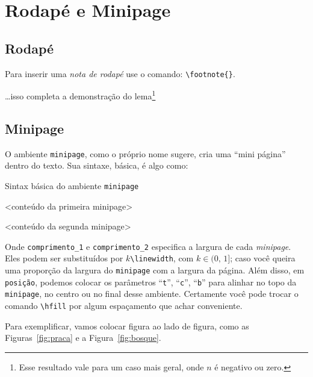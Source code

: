 %
  \section{Rodapé e Minipage} %
  \label{sec:pemini}
%
%
  \subsection{Rodapé}
%
Para inserir uma \textit{nota de rodapé} use o comando: \Verb|\footnote{}|.

\begin{tcblisting}{}
\ldots isso completa a demonstração do lema\footnote{Esse resultado vale para 
um caso mais geral, onde $n$ é negativo ou zero.}
\end{tcblisting}

%
  \subsection{Minipage}
%

O ambiente \texttt{minipage}, como o próprio nome sugere, cria uma ``mini página'' 
dentro do texto.
Sua sintaxe, básica, é algo como:

\begin{codigo}{Sintax básica do ambiente \texttt{minipage}}{\lapis}
\begin{minipage}[posição]{comprimento_1}
  <conteúdo da primeira minipage>
\end{minipage}
\hfill
\begin{minipage}[posição]{comprimento_2}
  <conteúdo da segunda minipage>
\end{minipage}
\end{codigo}

Onde \texttt{comprimento\_1} e \texttt{comprimento\_2} especifica a largura de 
cada \textit{minipage}.
Eles podem ser substituídos por \texttt{$k$\textbackslash linewidth}, com 
$k\in(0,\,1]$; caso você queira uma proporção da largura do \texttt{minipage} 
com a largura da página.
Além disso, em \texttt{posição}, podemos colocar os parâmetros ``\texttt{t}'', 
``\texttt{c}'', ``\texttt{b}'' para alinhar no topo da \texttt{minipage}, no 
centro ou no final desse ambiente.
Certamente você pode trocar o comando \Verb|\hfill| por algum espaçamento que 
achar conveniente.

Para exemplificar, vamos colocar figura ao lado de figura, como as Figuras~\ref{fig:praca} e
a Figura~\ref{fig:bosque}.

